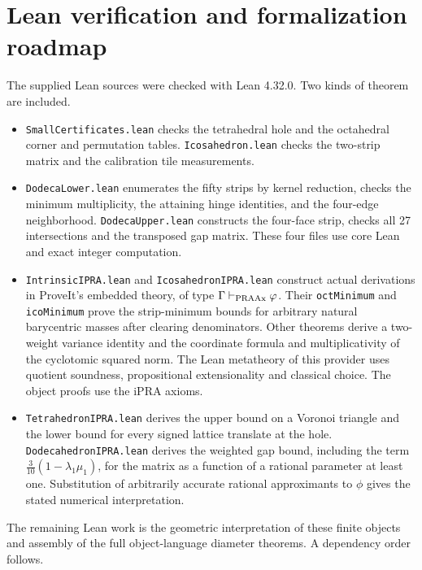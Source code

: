 \section{Lean verification and formalization roadmap}
The supplied Lean sources were checked with Lean 4.32.0. Two kinds of theorem are included.
\begin{itemize}
\item \texttt{SmallCertificates.lean} checks the tetrahedral hole and the octahedral corner and permutation tables. \texttt{Icosahedron.lean} checks the two-strip matrix and the calibration tile measurements.
\item \texttt{DodecaLower.lean} enumerates the fifty strips by kernel reduction, checks the minimum multiplicity, the attaining hinge identities, and the four-edge neighborhood. \texttt{DodecaUpper.lean} constructs the four-face strip, checks all 27 intersections and the transposed gap matrix. These four files use core Lean and exact integer computation.
\item \texttt{IntrinsicIPRA.lean} and \texttt{IcosahedronIPRA.lean} construct actual derivations in ProveIt's embedded theory, of type $\Gamma\vdash_{\rm PRAAx}\varphi$. Their \texttt{octMinimum} and \texttt{icoMinimum} prove the strip-minimum bounds for arbitrary natural barycentric masses after clearing denominators. Other theorems derive a two-weight variance identity and the coordinate formula and multiplicativity of the cyclotomic squared norm. The Lean metatheory of this provider uses quotient soundness, propositional extensionality and classical choice. The object proofs use the iPRA axioms.
\item \texttt{TetrahedronIPRA.lean} derives the upper bound on a Voronoi triangle and the lower bound for every signed lattice translate at the hole. \texttt{DodecahedronIPRA.lean} derives the weighted gap bound, including the term $\frac3{10}(1-\lambda_1\mu_1)$, for the matrix as a function of a rational parameter at least one. Substitution of arbitrarily accurate rational approximants to $\phi$ gives the stated numerical interpretation.
\end{itemize}
The remaining Lean work is the geometric interpretation of these finite objects and assembly of the full object-language diameter theorems. A dependency order follows.
